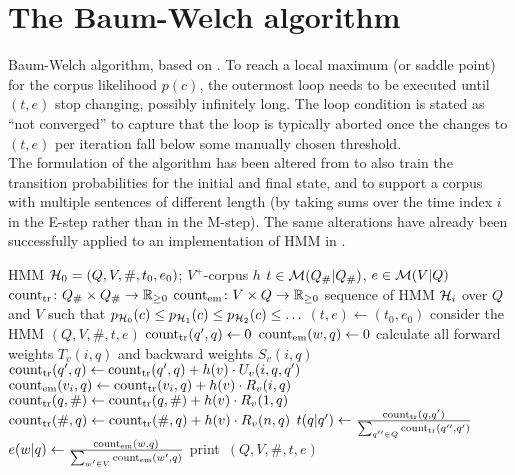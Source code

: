 \section{The Baum-Welch algorithm}

\begin{algorithm}[p!]
 \caption{Baum-Welch algorithm, based on \cite[p.~226]{jm09}. To reach a local
 maximum (or saddle point) for the corpus likelihood $p(c)$, the outermost loop
 needs to be executed until $(t,e)$ stop changing, possibly infinitely long.
 The loop condition is stated as ``not converged'' to capture that the loop is
 typically aborted once the changes to $(t,e)$ per iteration fall below some
 manually chosen threshold.\\[1em]
 The formulation of the algorithm has been altered from \cite{jm09} to also
 train the transition probabilities for the initial and final state, and to
 support a corpus with multiple sentences of different length (by taking sums
 over the time index $i$ in the E-step rather than in the M-step). The same
 alterations have already been successfully applied to an implementation of HMM
 in \cite{nel13}. \label{alg:bw-vogler}}
 \begin{algorithmic}[1]
  \algorithmheader[Input:] HMM $\mathcal H_0 = (Q,V,\#,t_0,e_0)$; $V^+$-corpus $h$
  \algorithmheader[Variables:] $t\in\mathcal M(Q_\#|Q_\#)$, $e\in\mathcal M(V|Q)$
  \algorithmheader             $\operatorname{count}_\mathrm{tr}\colon Q_\#\times Q_\#\to\mathbb R_{\geq0}$
  \algorithmheader             $\operatorname{count}_\mathrm{em}\colon V\times Q\to\mathbb R_{\geq0}$
  \algorithmheader[Output:] sequence of HMM $\mathcal H_i$ over $Q$ and $V$
  \algorithmheader such that $p_{\mathcal H_0}(c) \leq p_{\mathcal H_1}(c) \leq p_{\mathcal H_2}(c) \leq \ldots$
  \STATE $(t,e) \leftarrow (t_0,e_0)$
   \STATE consider the HMM $(Q,V,\#,t,e)$
   \STATE $\operatorname{count}_\mathrm{tr}(q',q) \leftarrow 0$ 
   \STATE $\operatorname{count}_\mathrm{em}(w,q) \leftarrow 0$ 
    \STATE calculate all forward weights $T_v(i,q)$ and backward weights $S_v(i,q)$
      \STATE $\operatorname{count}_\mathrm{tr}(q',q) \leftarrow \operatorname{count}_\mathrm{tr}(q',q) + h(v) \cdot U_v(i,q,q')$
     \ENDFOR
    \ENDFOR
      \STATE $\operatorname{count}_\mathrm{em}(v_i,q) \leftarrow \operatorname{count}_\mathrm{tr}(v_i,q) + h(v) \cdot R_v(i,q)$
     \ENDFOR
    \ENDFOR
     \STATE $\operatorname{count}_\mathrm{tr}(q,\#) \leftarrow \operatorname{count}_\mathrm{tr}(q,\#) + h(v) \cdot R_v(1,q)$
     \STATE $\operatorname{count}_\mathrm{tr}(\#,q) \leftarrow \operatorname{count}_\mathrm{tr}(\#,q) + h(v) \cdot R_v(n,q)$
    \ENDFOR
   \ENDFOR
    \STATE $t(q|q') \leftarrow \frac{\operatorname{count}_\mathrm{tr}(q,q')}{\sum_{q''\in Q} \operatorname{count}_\mathrm{tr}(q'',q')}$
   \ENDFOR
    \STATE $e(w|q) \leftarrow \frac{\operatorname{count}_\mathrm{em}(w,q)}{\sum_{w'\in V} \operatorname{count}_\mathrm{em}(w',q)}$
   \ENDFOR
   \STATE print~$(Q,V,\#,t,e)$
  \ENDWHILE
 \end{algorithmic}
\end{algorithm}


